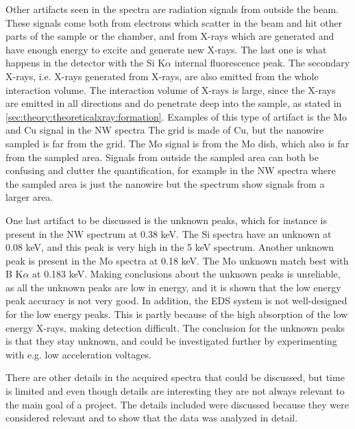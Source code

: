 Other artifacts seen in the spectra are radiation signals from outside the beam.
These signals come both from electrons which scatter in the beam and hit other parts of the sample or the chamber, and from X-rays which are generated and have enough energy to excite and generate new X-rays.
The last one is what happens in the detector with the Si K$\alpha$ internal fluorescence peak.
The secondary X-rays, i.e. X-rays generated from X-rays, are also emitted from the whole interaction volume.
The interaction volume of X-rays is large, since the X-rays are emitted in all directions and do penetrate deep into the sample, as stated in \cref{sec:theory:theoreticalxray:formation}.
Examples of this type of artifact is the Mo and Cu signal in the NW spectra
The grid is made of Cu, but the nanowire sampled is far from the grid.
The Mo signal is from the Mo dish, which also is far from the sampled area.
Signals from outside the sampled area can both be confusing and clutter the quantification, for example in the NW spectra where the sampled area is just the nanowire but the spectrum show signals from a larger area.


One last artifact to be discussed is the unknown peaks, which for instance is present in the NW spectrum at 0.38 keV.
The Si spectra have an unknown at 0.08 keV, and this peak is very high in the 5 keV spectrum.
Another unknown peak is present in the Mo spectra at 0.18 keV.
The Mo unknown match best with B K$\alpha$ at 0.183 keV.
Making conclusions about the unknown peaks is unreliable, as all the unknown peaks are low in energy, and it is shown that the low energy peak accuracy is not very good.
In addition, the EDS system is not well-designed for the low energy peaks.
This is partly because of the high absorption of the low energy X-rays, making detection difficult.
The conclusion for the unknown peaks is that they stay unknown, and could be investigated further by experimenting with e.g. low acceleration voltages.


There are other details in the acquired spectra that could be discussed, but time is limited and even though details are interesting they are not always relevant to the main goal of a project.
The details included were discussed because they were considered relevant and to show that the data was analyzed in detail.









